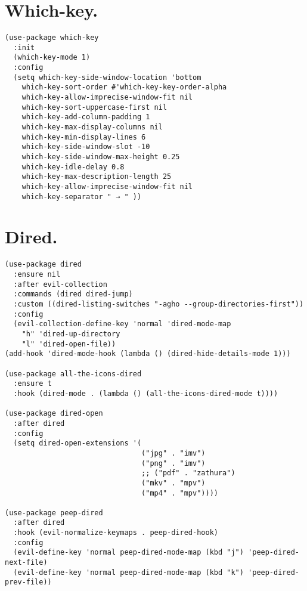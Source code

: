 \documentclass[11pt]{article}
\begin{document}
\section{Which-key.}
\label{sec:org226a5d4}
\begin{verbatim}
(use-package which-key
  :init
  (which-key-mode 1)
  :config
  (setq which-key-side-window-location 'bottom
    which-key-sort-order #'which-key-key-order-alpha
    which-key-allow-imprecise-window-fit nil
    which-key-sort-uppercase-first nil
    which-key-add-column-padding 1
    which-key-max-display-columns nil
    which-key-min-display-lines 6
    which-key-side-window-slot -10
    which-key-side-window-max-height 0.25
    which-key-idle-delay 0.8
    which-key-max-description-length 25
    which-key-allow-imprecise-window-fit nil
    which-key-separator " → " ))
\end{verbatim}
\section{Dired.}
\label{sec:org44137dd}
\begin{verbatim}
(use-package dired
  :ensure nil
  :after evil-collection
  :commands (dired dired-jump)
  :custom ((dired-listing-switches "-agho --group-directories-first"))
  :config
  (evil-collection-define-key 'normal 'dired-mode-map
    "h" 'dired-up-directory
    "l" 'dired-open-file))
(add-hook 'dired-mode-hook (lambda () (dired-hide-details-mode 1)))

(use-package all-the-icons-dired
  :ensure t
  :hook (dired-mode . (lambda () (all-the-icons-dired-mode t))))

(use-package dired-open
  :after dired
  :config
  (setq dired-open-extensions '(
                                ("jpg" . "imv")
                                ("png" . "imv")
                                ;; ("pdf" . "zathura")
                                ("mkv" . "mpv")
                                ("mp4" . "mpv"))))

(use-package peep-dired
  :after dired
  :hook (evil-normalize-keymaps . peep-dired-hook)
  :config
  (evil-define-key 'normal peep-dired-mode-map (kbd "j") 'peep-dired-next-file)
  (evil-define-key 'normal peep-dired-mode-map (kbd "k") 'peep-dired-prev-file))

\end{verbatim}
\end{document}
